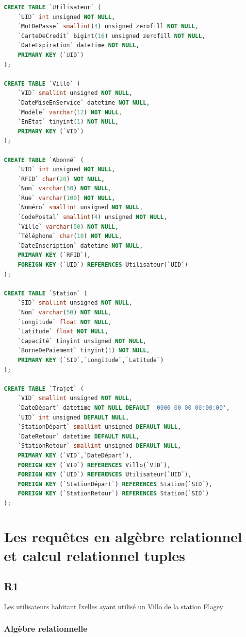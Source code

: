 \documentclass[a4paper, 12pt]{report}
\begin{document}
\begin{lstlisting}[language=sql]
CREATE TABLE `Utilisateur` (
	`UID` int unsigned NOT NULL,
	`MotDePasse` smallint(4) unsigned zerofill NOT NULL,
	`CarteDeCredit` bigint(16) unsigned zerofill NOT NULL,
	`DateExpiration` datetime NOT NULL,
	PRIMARY KEY (`UID`)
);

CREATE TABLE `Villo` (
	`VID` smallint unsigned NOT NULL,
	`DateMiseEnService` datetime NOT NULL,
	`Modèle` varchar(12) NOT NULL,
	`EnEtat` tinyint(1) NOT NULL,
	PRIMARY KEY (`VID`)
);

CREATE TABLE `Abonné` (
	`UID` int unsigned NOT NULL,
	`RFID` char(20) NOT NULL,
	`Nom` varchar(50) NOT NULL,
	`Rue` varchar(100) NOT NULL,
	`Numéro` smallint unsigned NOT NULL,
	`CodePostal` smallint(4) unsigned NOT NULL,
	`Ville` varchar(50) NOT NULL,
	`Téléphone` char(10) NOT NULL,
	`DateInscription` datetime NOT NULL,
	PRIMARY KEY (`RFID`),
	FOREIGN KEY (`UID`) REFERENCES Utilisateur(`UID`)
);

CREATE TABLE `Station` (
	`SID` smallint unsigned NOT NULL,
	`Nom` varchar(50) NOT NULL,
	`Longitude` float NOT NULL,
	`Latitude` float NOT NULL,
	`Capacité` tinyint unsigned NOT NULL,
	`BorneDePaiement` tinyint(1) NOT NULL,
	PRIMARY KEY (`SID`,`Longitude`,`Latitude`)
);

CREATE TABLE `Trajet` (
	`VID` smallint unsigned NOT NULL,
	`DateDépart` datetime NOT NULL DEFAULT '0000-00-00 00:00:00',
	`UID` int unsigned DEFAULT NULL,
	`StationDépart` smallint unsigned DEFAULT NULL,
	`DateRetour` datetime DEFAULT NULL,
	`StationRetour` smallint unsigned DEFAULT NULL,
	PRIMARY KEY (`VID`,`DateDépart`),
	FOREIGN KEY (`VID`) REFERENCES Villo(`VID`),
	FOREIGN KEY (`UID`) REFERENCES Utilisateur(`UID`),
	FOREIGN KEY (`StationDépart`) REFERENCES Station(`SID`),
	FOREIGN KEY (`StationRetour`) REFERENCES Station(`SID`)
);
\end{lstlisting}

\section*{Les requêtes en algèbre relationnel et calcul relationnel tuples} %

\subsection*{R1}

Les utilisateurs habitant Ixelles ayant utilisé un Villo de la station Flagey

\subsubsection*{Algèbre relationnelle}
\end{document}
